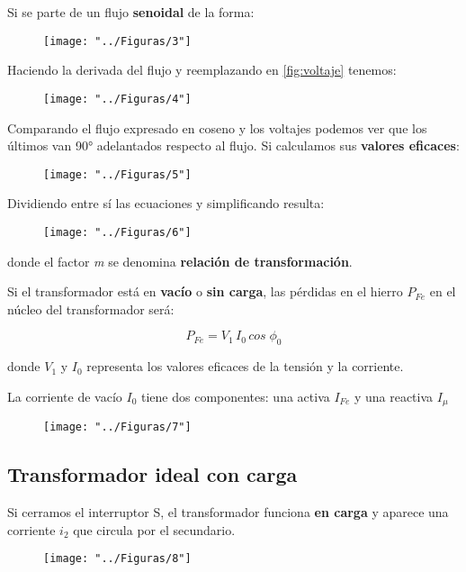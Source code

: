 Si se parte de un flujo \textbf{senoidal} de la forma:
 \begin{figure}[!htbp]
	\centering
	\texttt{[image: "../Figuras/3"]}
\end{figure} 

Haciendo la derivada del flujo y reemplazando en \ref{fig:voltaje} tenemos:
 \begin{figure}[!htbp]
	\centering
	\texttt{[image: "../Figuras/4"]}
\end{figure} 

Comparando el flujo expresado en coseno y los voltajes podemos ver que los últimos van 90° adelantados respecto al flujo. Si calculamos sus \textbf{valores eficaces}:

 \begin{figure}[!htbp]
	\centering
	\texttt{[image: "../Figuras/5"]}
\end{figure} 

Dividiendo entre sí las ecuaciones y simplificando resulta:

 \begin{figure}[H]
	\centering
	\texttt{[image: "../Figuras/6"]}
\end{figure} 

donde el factor \textit{m} se denomina \textbf{relación de transformación}.

Si el transformador está en \textbf{vacío} o \textbf{sin carga}, las pérdidas en el hierro $P_{Fe}$ en el núcleo del transformador será:

\begin{equation}
	P_{Fe} = V_{1}\,I_{0}\,cos\;\phi_{0}
\end{equation}

donde $V_{1}$ y $I_{0}$ representa los valores eficaces de la tensión y la corriente.

La corriente de vacío $I_{0}$ tiene dos componentes: una activa $I_{Fe}$ y una reactiva $I_{\mu}$

 \begin{figure}[!htbp]
	\centering
	\texttt{[image: "../Figuras/7"]}
\end{figure} 

\subsection{Transformador ideal con carga}

Si cerramos el interruptor S, el transformador funciona \textbf{en carga} y aparece una corriente $i_{2}$ que circula por el secundario.
 \begin{figure}[!htbp]
	\centering
	\texttt{[image: "../Figuras/8"]}
\end{figure} 

